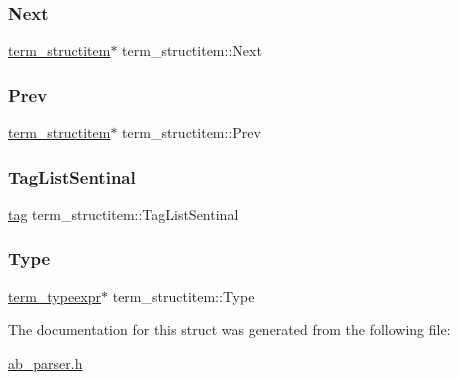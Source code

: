 \subsubsection{\texorpdfstring{Next}{Next}}
{\footnotesize\ttfamily \hyperlink{structterm__structitem}{term\+\_\+structitem}$\ast$ term\+\_\+structitem\+::\+Next}

\mbox{\label{structterm__structitem_a724d81ad66a76f54b153a97a8b175b7d}} 
\subsubsection{\texorpdfstring{Prev}{Prev}}
{\footnotesize\ttfamily \hyperlink{structterm__structitem}{term\+\_\+structitem}$\ast$ term\+\_\+structitem\+::\+Prev}

\mbox{\label{structterm__structitem_a25c03f6130b24c035dadd65fbe5f0110}} 
\subsubsection{\texorpdfstring{Tag\+List\+Sentinal}{TagListSentinal}}
{\footnotesize\ttfamily \hyperlink{structtag}{tag} term\+\_\+structitem\+::\+Tag\+List\+Sentinal}

\mbox{\label{structterm__structitem_ac2a7c2261f1714cedb33376eb440e66c}} 
\subsubsection{\texorpdfstring{Type}{Type}}
{\footnotesize\ttfamily \hyperlink{structterm__typeexpr}{term\+\_\+typeexpr}$\ast$ term\+\_\+structitem\+::\+Type}



The documentation for this struct was generated from the following file\+:\begin{DoxyCompactItemize}
\item 
\hyperlink{ab__parser_8h}{ab\+\_\+parser.\+h}\end{DoxyCompactItemize}
